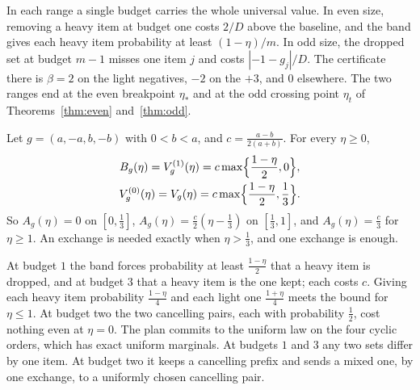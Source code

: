 In each range a single budget carries the whole universal value. In even size, removing a heavy
item at budget one costs $2/D$ above the baseline, and the band gives each heavy item
probability at least $(1-\eta)/m$. In odd size, the dropped set at budget $m-1$ misses one item
$j$ and costs $|-1-g_{j}|/D$. The certificate there is $\beta=2$ on the light negatives, $-2$ on
the $+3$, and $0$ elsewhere. The two ranges end at the even breakpoint $\eta_*$ and at the odd
crossing point $\eta_t$ of Theorems~\ref{thm:even} and~\ref{thm:odd}.

\begin{theorem}
\label{thm:fourrecourse}
Let $g=(a,-a,b,-b)$ with $0<b<a$, and $c=\frac{a-b}{2(a+b)}$. For every $\eta\ge0$,
\begin{gather*}
B_{g}(\eta)=V^{(1)}_{g}(\eta)=c\max\Bigl\{\frac{1-\eta}2,0\Bigr\},\\
V^{(0)}_{g}(\eta)=V_{g}(\eta)=c\max\Bigl\{\frac{1-\eta}2,\frac13\Bigr\}.
\end{gather*}
So $A_{g}(\eta)=0$ on $[0,\frac13]$, $A_g(\eta)=\frac c2(\eta-\frac13)$ on $[\frac13,1]$, and
$A_g(\eta)=\frac c3$ for $\eta\ge1$. An exchange is needed exactly when $\eta>\frac13$, and one
exchange is enough.
\end{theorem}

At budget $1$ the band forces probability at least $\frac{1-\eta}2$ that a heavy item is dropped,
and at budget $3$ that a heavy item is the one kept; each costs $c$. Giving each heavy item
probability $\frac{1-\eta}4$ and each light one $\frac{1+\eta}4$ meets the bound for $\eta\le1$. At budget two
the two cancelling pairs, each with probability $\frac12$, cost nothing even at $\eta=0$. The
plan commits to the uniform law on the four cyclic orders, which has exact uniform marginals.
At budgets $1$ and $3$ any two sets differ by one item. At budget two it keeps a cancelling
prefix and sends a mixed one, by one exchange, to a uniformly chosen cancelling pair.

